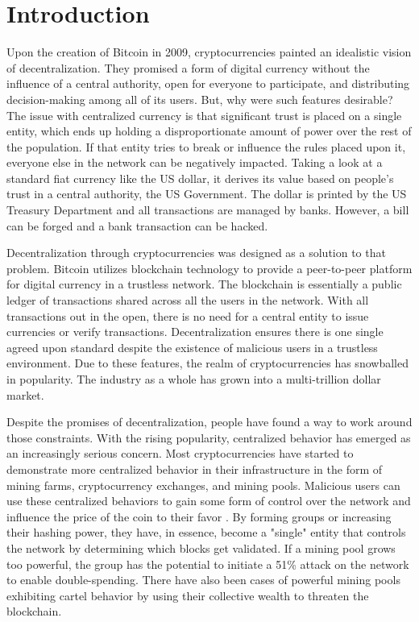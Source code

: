 \chapter{Introduction}
Upon the creation of Bitcoin in 2009, cryptocurrencies painted an idealistic vision of decentralization. They promised a form of digital currency without the influence of a central authority, open for everyone to participate, and distributing decision-making among all of its users. But, why were such features desirable? The issue with centralized currency is that significant trust is placed on a single entity, which ends up holding a disproportionate amount of power over the rest of the population. If that entity tries to break or influence the rules placed upon it, everyone else in the network can be negatively impacted. Taking a look at a standard fiat currency like the US dollar, it derives its value based on people's trust in a central authority, the US Government. The dollar is printed by the US Treasury Department and all transactions are managed by banks. However, a bill can be forged and a bank transaction can be hacked.

Decentralization through cryptocurrencies was designed as a solution to that problem. Bitcoin utilizes blockchain technology to provide a peer-to-peer platform for digital currency in a trustless network. The blockchain is essentially a public ledger of transactions shared across all the users in the network. With all transactions out in the open, there is no need for a central entity to issue currencies or verify transactions.   Decentralization ensures there is one single agreed upon standard despite the existence of malicious users in a trustless environment. Due to these features, the realm of cryptocurrencies has snowballed in popularity. The industry as a whole has grown into a multi-trillion dollar market.

Despite the promises of decentralization, people have found a way to work around those constraints. With the rising popularity, centralized behavior has emerged as an increasingly serious concern. Most cryptocurrencies have started to demonstrate more centralized behavior in their infrastructure in the form of mining farms, cryptocurrency exchanges, and mining pools. Malicious users can use these centralized behaviors to gain some form of control over the network and influence the price of the coin to their favor \cite{CRYPTO:1}. By forming groups or increasing their hashing power, they have, in essence, become a "single" entity that controls the network by determining which blocks get validated. If a mining pool grows too powerful, the group has the potential to initiate a 51\% attack on the network to enable double-spending. There have also been cases of powerful mining pools exhibiting cartel behavior by using their collective wealth to threaten the blockchain.

